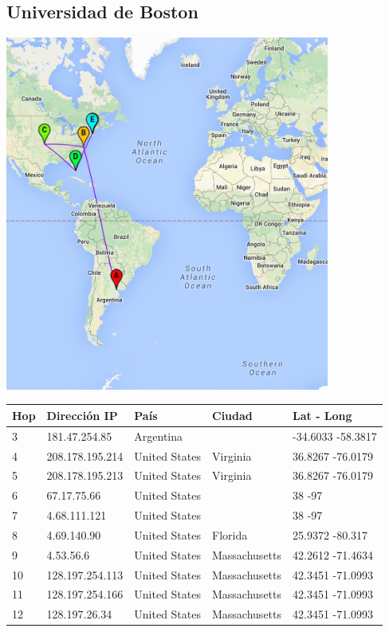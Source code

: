 \subsection{Universidad de Boston}
\centerline{\includegraphics[width=0.8\textwidth]{mapas/EEUU.jpg}}

\begin{center}
 \begin{tabular}{|l|l|l|l|l|}
    \hline
    Hop &Dirección IP &País &Ciudad &Lat - Long \\ \hline \hline
    3 & 181.47.254.85 & Argentina  &  & -34.6033 -58.3817 \\ \hline
    4 & 208.178.195.214 & United States & Virginia  & 36.8267 -76.0179 \\ \hline
    5 & 208.178.195.213 & United States & Virginia  & 36.8267 -76.0179 \\ \hline
    6 & 67.17.75.66 & United States  &  & 38 -97 \\ \hline
    7 & 4.68.111.121 & United States  &  & 38 -97 \\ \hline
    8 & 4.69.140.90 & United States & Florida  & 25.9372 -80.317 \\ \hline
    9 & 4.53.56.6 & United States & Massachusetts  & 42.2612 -71.4634 \\ \hline
    10 & 128.197.254.113 & United States & Massachusetts  & 42.3451 -71.0993 \\ \hline
    11 & 128.197.254.166 & United States & Massachusetts  & 42.3451 -71.0993 \\ \hline
    12 & 128.197.26.34 & United States & Massachusetts  & 42.3451 -71.0993 \\ \hline
 \end{tabular}
\end{center}

